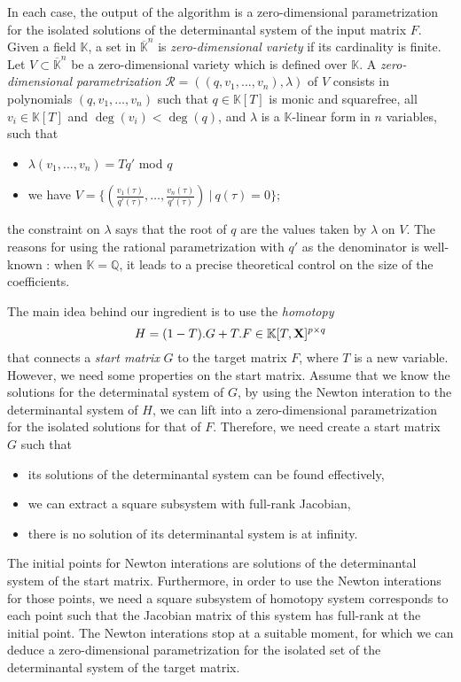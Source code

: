 \documentclass[11pt]{article}
\numberwithin{Property}{section}
\numberwithin{Theorem}{section}
\numberwithin{Proposition}{section}
\numberwithin{Lemma}{section}
\numberwithin{Corollary}{section}
\numberwithin{Definition}{section}
\numberwithin{Remark}{section}
\numberwithin{Conjecture}{section}
\numberwithin{Problem}{section}
\numberwithin{Claim}{section}
\theoremstyle{definition}
\numberwithin{Example}{section}
\def\bar{\overline}
\newcommand{\field}{\mathbb{K}} %
\newcommand{\mat}[1]{\mathbf{\MakeUppercase{#1}}} %
\begin{document}
In each case, the output of the algorithm is a zero-dimensional parametrization for the isolated solutions of the determinantal system of the input matrix $F$. Given a field $\field$, a set in $\bar{\field}^n$ is \emph{zero-dimensional variety} if its cardinality is finite. Let $V \subset \bar{\field}^n$ be a zero-dimensional variety which is defined over $\field$. A \emph{zero-dimensional parametrization} $\mathscr{R} = ((q,v_1, \ldots, v_n), \lambda)$ of $V$ consists in polynomials $(q,v_1, \ldots, v_n)$ such that $q \in \field[T]$ is monic and squarefree, all $v_i \in \field[T]$ and $\deg(v_i) < \deg(q)$, and $\lambda$ is a $\field$-linear form in $n$ variables, such that 
\begin{itemize}
\item $\lambda(v_1, \ldots, v_n) = Tq'$ mod $q$
\item we have $V = \{(\frac{v_1(\tau)}{q'(\tau)}, \ldots, \frac{v_n(\tau)}{q'(\tau)}) \ | \ q(\tau) = 0\}$;
\end{itemize}
the constraint on $\lambda$ says that the root of $q$ are the values taken by $\lambda$ on $V$. The reasons for using the rational parametrization with $q'$ as the denominator is well-known \cite{Alonso1996, SaSc16, GiLeSa01, Rouillier1999} : when $\field = \mathbb{Q}$, it leads to a precise theoretical control on the size of the coefficients. 

The main idea behind our ingredient is to use the \emph{homotopy} 
\[H = (1-T).G + T.F \in \field[T, \mat{X}]^{p \times q}\]
that connects a \emph{start matrix} $G$ to the target matrix $F$, where $T$ is a new variable. However, we need some properties on the start matrix. Assume that we know the solutions for the determinatal system of $G$, by using the Newton interation to the determinantal system of $H$, we can lift into a zero-dimensional parametrization for the isolated solutions for that of $F$. Therefore, we need create a start matrix $G$ such that
\begin{itemize}
\item its solutions of the determinantal system can be found effectively,
\item we can extract a square subsystem with full-rank Jacobian,
\item there is no solution of its determinantal system is at infinity. 
\end{itemize}

The initial points for Newton interations are solutions of the determinantal system of the start matrix. Furthermore, in order to use the Newton interations for those points, we need a square subsystem of homotopy system corresponds to each point such that the Jacobian matrix of this system has full-rank at the initial point.  The Newton interations stop at a suitable moment, for which we can deduce a zero-dimensional parametrization for the isolated set of the determinantal system of the target matrix. 
\end{document}
